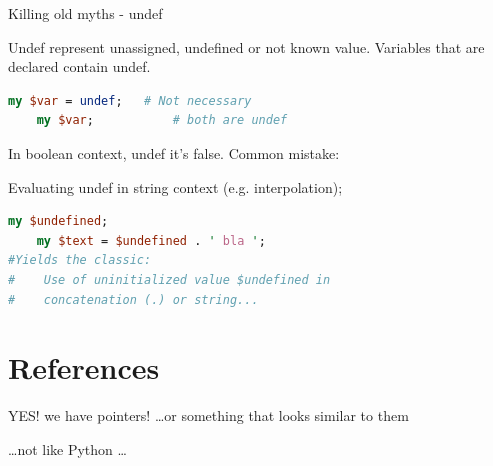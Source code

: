 \documentclass[10pt]{beamer}
\begin{document}
\begin{frame}[fragile]{Killing old myths - undef}

Undef represent unassigned, undefined or not known value. Variables that are declared contain undef.

\begin{lstlisting}[language=perl]
    my $var = undef;   # Not necessary
    my $var;           # both are undef
\end{lstlisting}

In boolean context, undef it's false. Common mistake:

Evaluating undef in string context (e.g. interpolation);
\begin{lstlisting}[language=perl]
    my $undefined;
    my $text = $undefined . ' bla ';
#Yields the classic: 
#    Use of uninitialized value $undefined in
#    concatenation (.) or string...
\end{lstlisting}

\end{frame}




\section{References}

\begin{frame}[standout]
\begin{center}
\huge YES! we have pointers!
\ldots or something that looks similar to them
\end{center}
\begin{center}
\ldots not like Python \ldots
\end{center}
\end{frame}
\end{document}
